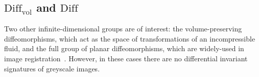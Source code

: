 \documentclass[review,onefignum,onetabnum]{siamonline190516}
\def\R{\mathbb{R}}
\begin{document}





\subsection{$\mathrm{Diff}_{\mathrm{vol}}$ and $\mathrm{Diff}$}

Two other infinite-dimensional groups are of interest: the volume-preserving diffeomorphisms, which act as the space of transformations of an incompressible fluid, and the full group of planar diffeomorphisms, which are widely-used in image registration~\citep{YounesBook}. However, in these cases there are no differential invariant signatures of greyscale images.
\end{document}
